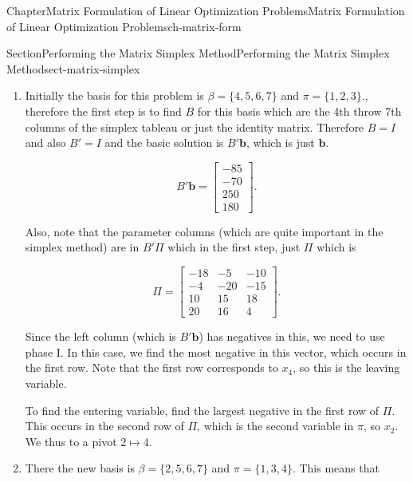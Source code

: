 \documentclass[oneside,10pt,]{book}
\numberwithin{equation}{section}
\newcommand{\amp}{&}
\begin{document}
\begin{chapterptx}{Chapter}{Matrix Formulation of Linear Optimization Problems}{}{Matrix Formulation of Linear Optimization Problems}{}{}{ch-matrix-form}
\begin{sectionptx}{Section}{Performing the Matrix Simplex Method}{}{Performing the Matrix Simplex Method}{}{}{sect-matrix-simplex}
\begin{introduction}{}
\par
%
\begin{enumerate}
\item{}Initially the basis for this problem is \(\beta=\{4,5,6,7\}\) and \(\pi=\{1,2,3\}.\), therefore the first step is to find \(B\) for this basis which are the 4th throw 7th columns of the simplex tableau or just the identity matrix. Therefore \(B=I\) and also \(B'=I\) and the basic solution is \(B'\boldsymbol{b}\), which is just \(\boldsymbol{b}\).%
\par
%
\begin{equation*}
B' \boldsymbol{b} = \begin{bmatrix} -85 \\ -70 \\ 250 \\ 180 \end{bmatrix}.
\end{equation*}
%
\par
Also, note that the parameter columns (which are quite important in the simplex method) are in \(B'\Pi\) which in the first step, just \(\Pi\) which is%
\par
%
\begin{equation*}
\Pi = \begin{bmatrix} -18 \amp -5 \amp -10 \\ -4 \amp -20 \amp -15 \\ 10 \amp 15 \amp 18 \\ 20 \amp 16 \amp 4 \end{bmatrix}.
\end{equation*}
%
\par
Since the left column (which is \(B'\boldsymbol{b}\)) has negatives in this, we need to use phase I. In this case, we find the most negative in this vector, which occurs in the first row. Note that the first row corresponds to \(x_4\), so this is the leaving variable.%
\par
To find the entering variable, find the largest negative in the first row of \(\Pi\). This occurs in the second row of \(\Pi\), which is the second variable in \(\pi\), so \(x_2\). We thus to a pivot \(2 \mapsto 4\).%
\item{}There the new basis is \(\beta = \{2,5,6,7\}\) and \(\pi=\{1,3,4\}\). This means that%
\par
%
\begin{equation*}

\end{equation*}
\end{enumerate}
\end{introduction}
\end{sectionptx}
\end{chapterptx}
\end{document}

